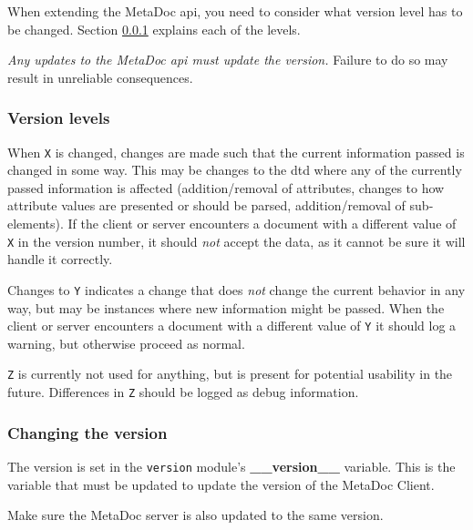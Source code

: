 When extending the MetaDoc \gls{api}, you need to consider what version level
has to be changed. Section \ref{sec:version_levels} explains each of the
levels.

\textit{Any updates to the MetaDoc \gls{api} must update the version.} Failure
to do so may result in unreliable consequences.

\subsubsection{Version levels}
\label{sec:version_levels}
When \texttt{X} is changed, changes are made such that the current information
passed is changed in some way. This may be changes to the \gls{dtd} where any
of the currently passed information is affected (addition/removal of
attributes, changes to how attribute values are presented or should be parsed,
addition/removal of sub-elements). If the client or server encounters a
document with a different value of \texttt{X} in the version number, it should
\textit{not} accept the data, as it cannot be sure it will handle it correctly.

Changes to \texttt{Y} indicates a change that does \textit{not} change the
current behavior in any way, but may be instances where new information might
be passed. When the client or server encounters a document with a different
value of \texttt{Y} it should log a warning, but otherwise proceed as normal.

\texttt{Z} is currently not used for anything, but is present for potential
usability in the future. Differences in \texttt{Z} should be logged as debug
information.

\subsubsection{Changing the version}
The version is set in the \texttt{version} module's \textbf{\_\_version\_\_}
variable. This is the variable that must be updated to update the version of
the MetaDoc Client.

Make sure the MetaDoc server is also updated to the same version.
